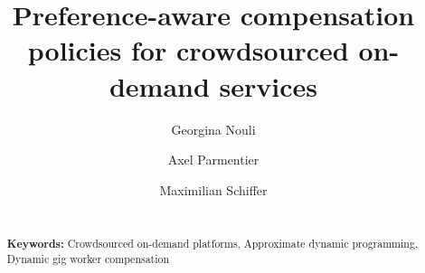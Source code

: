 
\title{\large Preference-aware compensation policies for crowdsourced on-demand services}

\author[1]{\normalsize Georgina Nouli}
\author[2]{\normalsize Axel Parmentier}
\author[1,3]{\normalsize Maximilian Schiffer}

\date{}

\lehead{\pagemark}
\rohead{\pagemark}

\begin{abstract}
\begin{singlespace}
{\small\noindent 
\smallskip}
{\\ \footnotesize\noindent \textbf{Keywords:} Crowdsourced on-demand platforms, Approximate dynamic programming, Dynamic gig worker compensation}
\end{singlespace}
\end{abstract}

\maketitle
